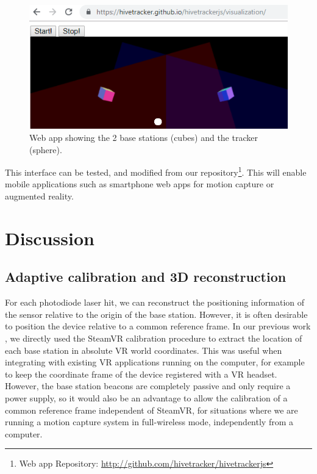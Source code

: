 \documentclass[sigchi]{acmart}
\begin{document}
\begin{figure}[h]
  \centering
  \includegraphics[width=\linewidth]{Figures/webapp.png}
  \caption{Web app showing the 2 base stations (cubes) and the tracker (sphere).}
  \label{Fig:webapp}
\end{figure}

This interface can be tested, and modified from our repository\footnote{Web app Repository: \url{http://github.com/hivetracker/hivetrackerjs}}. This will enable mobile applications such as smartphone web apps for motion capture or augmented reality.


\section{Discussion}

\subsection{Adaptive calibration and 3D reconstruction}

For each photodiode laser hit, we can reconstruct the positioning information of the sensor relative to the origin of the base station. However, it is often desirable to position the device relative to a common reference frame. In our previous work \cite{Quinones2018}, we directly used the SteamVR calibration procedure to extract the location of each base station in absolute VR world coordinates. This was useful when integrating with existing VR applications running on the computer, for example to keep the coordinate frame of the device registered with a VR headset. However, the base station beacons are completely passive and only require a power supply, so it would also be an advantage to allow the calibration of a common reference frame independent of SteamVR, for situations where we are running a motion capture system in full-wireless mode, independently from a computer.
\end{document}
